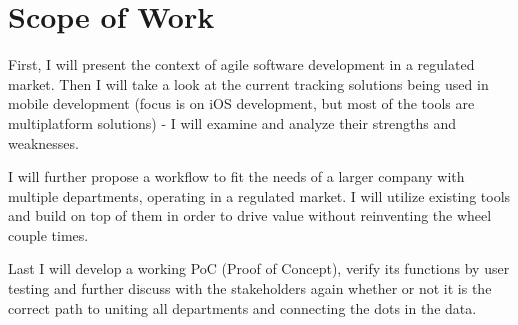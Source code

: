 \section{Scope of Work}

First, I will present the context of agile software development in a regulated market. Then I will take a look at the current tracking solutions being used in mobile development (focus is on iOS development, but most of the tools are multiplatform solutions) - I will examine and analyze their strengths and weaknesses. 

I will further propose a workflow to fit the needs of a larger company with multiple departments, operating in a regulated market. I will utilize existing tools and build on top of them in order to drive value without reinventing the wheel couple times.

Last I will develop a working PoC (Proof of Concept), verify its functions by user testing and further discuss with the stakeholders again whether or not it is the correct path to uniting all departments and connecting the dots in the data.